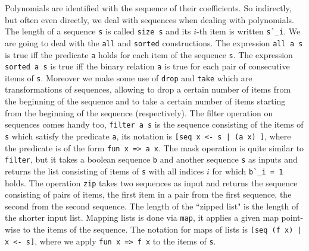 \documentclass[11pt, a4paper]{article}
\begin{document}
Polynomials are identified with the sequence of their coefficients. So indirectly, but often even directly, we deal with sequences when dealing with polynomials. %
The length of a sequence \lstinline!s! is called \lstinline!size s! and its $i$-th item is written \lstinline!s`_i!. We are going to deal with the \lstinline!all! and \lstinline!sorted! constructions. The expression \lstinline!all a s! is true iff the predicate \lstinline!a! holds for each item of the sequence \lstinline!s!. The expression \lstinline!sorted a s! is true iff the binary relation \lstinline!a! is true for each pair of consecutive items of \lstinline!s!. Moreover we make some use of \lstinline!drop! and \lstinline!take! which are transformations of sequences, allowing to drop a certain number of items from the beginning of the sequence and to take a certain number of items starting from the beginning of the sequence (respectively). The filter operation on sequences comes handy too, \lstinline!filter a s! is the sequence consisting of the items of \lstinline!s! which satisfy the predicate \lstinline!a!, its notation is \lstinline![seq x <- s | (a x) ]!, where the predicate is of the form \lstinline!fun x => a x!. The mask operation is quite similar to \lstinline!filter!, but it takes a boolean sequence \lstinline!b! and another sequence \lstinline!s! as inputs and returns the list consisting of items of \lstinline!s! with all indices $i$ for which \lstinline!b`_i = 1! holds.  The operation \lstinline!zip! takes two sequences as input and returns the sequence consisting of pairs of items, the first item in a pair from the first sequence, the second from the second sequence. The length of the ``zipped list" is the length of the shorter input list. Mapping lists is done via \lstinline!map!, it applies a given map point-wise to the items of the sequence. The notation for maps of lists is \lstinline![seq (f x) | x <- s]!, where we apply \lstinline!fun x => f x! to the items of \lstinline!s!.
\end{document}
